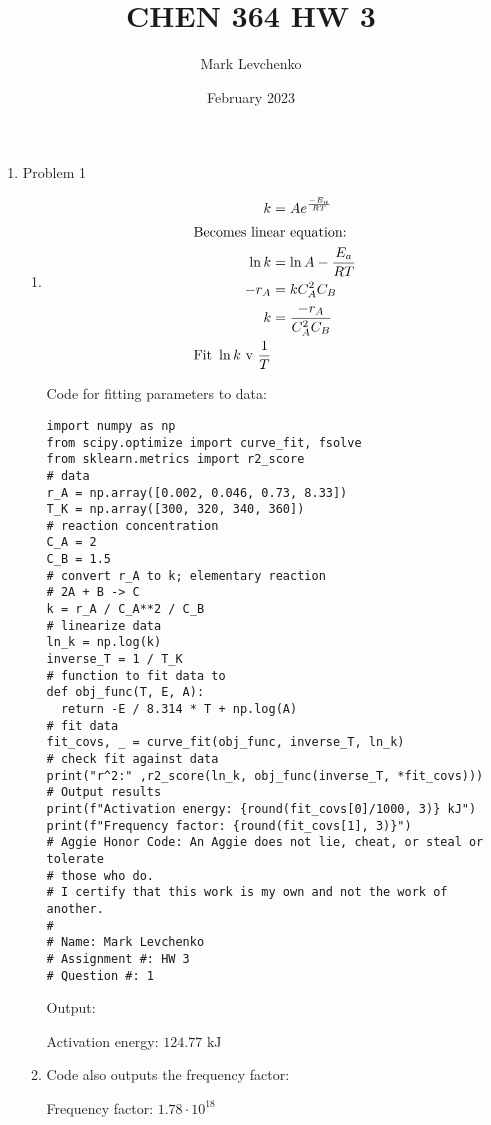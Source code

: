 \documentclass[12pt]{article}
\title{CHEN 364 HW 3}
\author{Mark Levchenko}
\date{February 2023}
\begin{document}
\begin{enumerate}
\newpage
    \item Problem 1
    \begin{enumerate}
        \item 
        \begin{align*}
            k &= A e^{\frac{-E_a}{RT}} \\
            \intertext{Becomes linear equation:}
            \ln{k} &= \ln{A} - \frac{E_a}{RT} \\
            -r_A &= k C_A^2 C_B \\
            k &= \frac{-r_A}{C_A^2 C_B} \\
            \text{Fit } \ln{k} \text{ v } \frac{1}{T}
        \end{align*}
        
        Code for fitting parameters to data:

\begin{verbatim}
import numpy as np
from scipy.optimize import curve_fit, fsolve
from sklearn.metrics import r2_score
# data
r_A = np.array([0.002, 0.046, 0.73, 8.33])
T_K = np.array([300, 320, 340, 360])
# reaction concentration
C_A = 2
C_B = 1.5
# convert r_A to k; elementary reaction
# 2A + B -> C
k = r_A / C_A**2 / C_B
# linearize data
ln_k = np.log(k)
inverse_T = 1 / T_K
# function to fit data to
def obj_func(T, E, A):
  return -E / 8.314 * T + np.log(A)
# fit data
fit_covs, _ = curve_fit(obj_func, inverse_T, ln_k)
# check fit against data
print("r^2:" ,r2_score(ln_k, obj_func(inverse_T, *fit_covs)))
# Output results
print(f"Activation energy: {round(fit_covs[0]/1000, 3)} kJ")
print(f"Frequency factor: {round(fit_covs[1], 3)}")
# Aggie Honor Code: An Aggie does not lie, cheat, or steal or tolerate
# those who do.
# I certify that this work is my own and not the work of another.
#
# Name: Mark Levchenko
# Assignment #: HW 3
# Question #: 1
\end{verbatim}

        Output:

        Activation energy: $\boxed{124.77\text{ kJ}}$

        \item Code also outputs the frequency factor:

        Frequency factor: $\boxed{1.78 \cdot 10^{18}}$

    \end{enumerate}





\end{enumerate}
\end{document}

